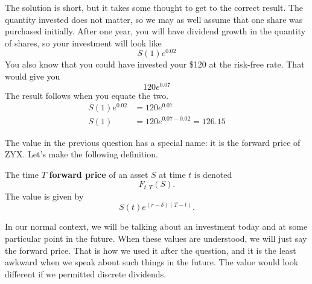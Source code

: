 \documentclass{ximera}
\begin{document}
\begin{solution}
The solution is short, but it takes some thought to get to the correct result. The quantity invested does not matter, so we may as well assume that one share was purchased initially. After one year, you will have dividend growth in the quantity of shares, so your investment will look like
	\begin{equation*}
		S(1)e^{0.02}
	\end{equation*}
You also know that you could have invested your \$120 at the risk-free rate. That would give you
	\begin{equation*}
		120e^{0.07}
	\end{equation*}
The result follows when you equate the two.
	\begin{align*}
		S(1)e^{0.02}&=120e^{0.07}\\
		S(1)&=120e^{0.07-0.02}=126.15
	\end{align*}
\end{solution}

The value in the previous question has a special name: it is the forward price of ZYX. Let's make the following definition.

\begin{definition}\label{def10}
The time $T$ {\bf forward price} of an asset $S$ at time $t$ is denoted 
	\begin{equation*}
		F_{t,T}(S).
	\end{equation*}
The value is given by 
	\begin{equation*}
		S(t)e^{(r-\delta)(T-t)}.
	\end{equation*}
\end{definition}

\begin{remark}
In our normal context, we will be talking about an investment today and at some particular point in the future. When these values are understood, we will just say the forward price. That is how we used it after the question, and it is the least awkward when we speak about such things in the future. The value would look different if we permitted discrete dividends.
\end{remark}
\end{document}
